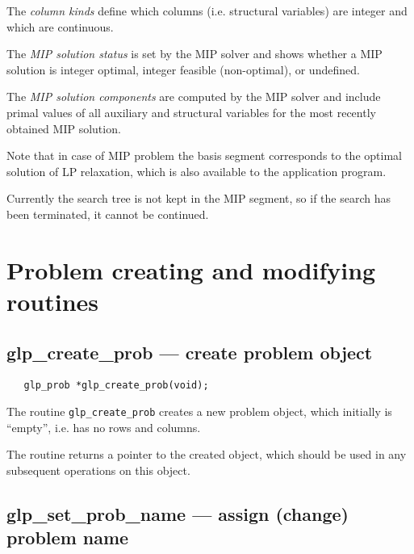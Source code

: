\vspace*{-8pt}

The {\it column kinds} define which columns (i.e. structural variables)
are integer and which are continuous.

The {\it MIP solution status} is set by the MIP solver and shows whether
a MIP solution is integer optimal, integer feasible (non-optimal), or
undefined.

The {\it MIP solution components} are computed by the MIP solver and
include primal values of all auxiliary and structural variables for the
most recently obtained MIP solution.

Note that in case of MIP problem the basis segment corresponds to
the optimal solution of LP relaxation, which is also available to the
application program.

Currently the search tree is not kept in the MIP segment, so if the
search has been terminated, it cannot be continued.


\newpage

\section{Problem creating and modifying routines}

\subsection{glp\_create\_prob --- create problem object}

\synopsis

\begin{verbatim}
   glp_prob *glp_create_prob(void);
\end{verbatim}

\description

The routine \verb|glp_create_prob| creates a new problem object, which
initially is ``empty'', i.e. has no rows and columns.

\returns

The routine returns a pointer to the created object, which should be
used in any subsequent operations on this object.

\subsection{glp\_set\_prob\_name --- assign (change) problem name}

